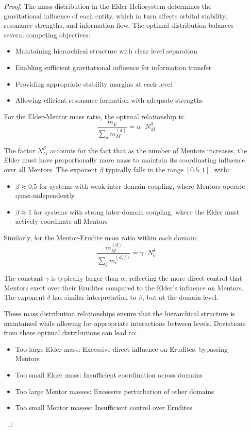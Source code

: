 \begin{proof}
The mass distribution in the Elder Heliosystem determines the gravitational influence of each entity, which in turn affects orbital stability, resonance strengths, and information flow. The optimal distribution balances several competing objectives:
\begin{itemize}
    \item Maintaining hierarchical structure with clear level separation
    \item Enabling sufficient gravitational influence for information transfer
    \item Providing appropriate stability margins at each level
    \item Allowing efficient resonance formation with adequate strengths
\end{itemize}

For the Elder-Mentor mass ratio, the optimal relationship is:
\begin{equation}
\frac{m_E}{\sum_d m_M^{(d)}} = \alpha \cdot N_M^{\beta}
\end{equation}

The factor $N_M^{\beta}$ accounts for the fact that as the number of Mentors increases, the Elder must have proportionally more mass to maintain its coordinating influence over all Mentors. The exponent $\beta$ typically falls in the range $[0.5, 1]$, with:
\begin{itemize}
    \item $\beta \approx 0.5$ for systems with weak inter-domain coupling, where Mentors operate quasi-independently
    \item $\beta \approx 1$ for systems with strong inter-domain coupling, where the Elder must actively coordinate all Mentors
\end{itemize}

Similarly, for the Mentor-Erudite mass ratio within each domain:
\begin{equation}
\frac{m_M^{(d)}}{\sum_j m_e^{(d,j)}} = \gamma \cdot N_e^{\delta}
\end{equation}

The constant $\gamma$ is typically larger than $\alpha$, reflecting the more direct control that Mentors exert over their Erudites compared to the Elder's influence on Mentors. The exponent $\delta$ has similar interpretation to $\beta$, but at the domain level.

These mass distribution relationships ensure that the hierarchical structure is maintained while allowing for appropriate interactions between levels. Deviations from these optimal distributions can lead to:
\begin{itemize}
    \item Too large Elder mass: Excessive direct influence on Erudites, bypassing Mentors
    \item Too small Elder mass: Insufficient coordination across domains
    \item Too large Mentor masses: Excessive perturbation of other domains
    \item Too small Mentor masses: Insufficient control over Erudites
\end{itemize}


\end{proof}

